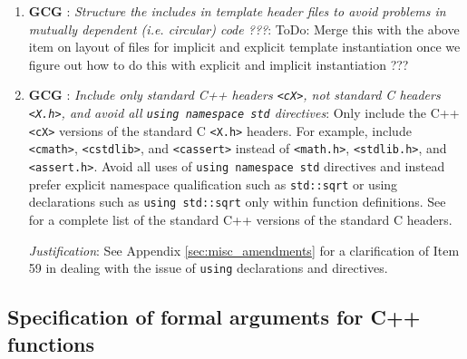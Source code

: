 \begin{enumerate}
\begin{itemize}
\end{itemize}

{}\item{}\textbf{GCG }:
{}\textit{Structure the includes in template header files to avoid problems in
mutually dependent (i.e. circular) code ???}: ToDo: Merge this with the above
item on layout of files for implicit and explicit template instantiation once
we figure out how to do this with explicit and implicit instantiation ???

{}\item{}\textbf{GCG }:
{}\textit{Include only standard C++ headers {}\texttt{<cX>}, not standard C
headers {}\texttt{<X.h>}, and avoid all {}\texttt{using namespace std}
directives}: Only include the C++ {}\texttt{<cX>} versions of the standard C
{}\texttt{<X.h>} headers.  For example, include {}\texttt{<cmath>},
{}\texttt{<cstdlib>}, and {}\texttt{<cassert>} instead of {}\texttt{<math.h>},
{}\texttt{<stdlib.h>}, and {}\texttt{<assert.h>}.  Avoid all uses of
{}\texttt{using namespace std} directives and instead prefer explicit
namespace qualification such as {}\texttt{std::sqrt} or using declarations
such as {}\texttt{using std::sqrt} only within function definitions.  See
{}\cite[Section ???]{stroustrup97} for a complete list of the standard C++
versions of the standard C headers.

{}\textit{Justification}: See Appendix {}\ref{sec:misc_amendments} for a
clarification of Item 59 in {}\cite{C++CodingStandards05} dealing with the
issue of {}\texttt{using} declarations and directives.


\end{enumerate}

%
\subsection{Specification of formal arguments for C++ functions}
\label{sec:func_arguments}
%

